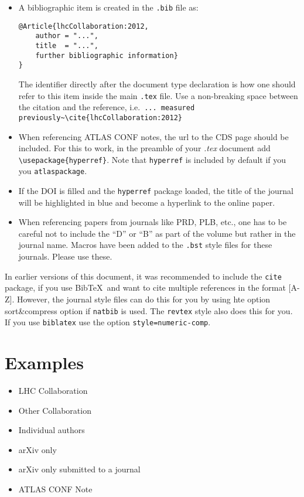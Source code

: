\documentclass[UKenglish]{latex/atlasdoc}
\newcommand*{\BibTeX}{Bib\TeX}
\newcommand{\File}[1]{\texttt{#1}\xspace}
\newcommand{\Option}[1]{\textsf{#1}\xspace}
\newcommand{\Package}[1]{\texttt{#1}\xspace}
\begin{document}
\begin{itemize}
\item A bibliographic item is created in the \File{.bib} file as:
\begin{verbatim}
@Article{lhcCollaboration:2012,
	author = "...",
	title  = "...",
	further bibliographic information}
}
\end{verbatim}
	The identifier directly after the document type declaration is how one should refer to this item inside the main \File{.tex} file.
	Use a non-breaking space between the citation and the reference, i.e.\
	\verb|... measured previously~\cite{lhcCollaboration:2012}|
\item When referencing ATLAS CONF notes, the url to the CDS page should be included.
	For this to work, in the preamble of your \emph{.tex} document add
	\texttt{\textbackslash usepackage\{hyperref\}}.
	Note that \Package{hyperref} is included by default	if you you \Package{atlaspackage}.
\item If the DOI is filled and the \texttt{hyperref} package loaded, 
	the title of the journal will be highlighted in blue and become a hyperlink to the online paper.
\item When referencing papers from journals like PRD, PLB, etc.,
	one has to be careful not to include the ``D'' or ``B'' as part of the volume but rather in the journal name. 
	Macros have been added to the \File{.bst} style files for these journals. Please use these.
\end{itemize}

In earlier versions of this document, it was recommended to include the \Package{cite} package, 
if you use \BibTeX\ and want to cite multiple references in the format [A-Z].
However, the journal style files can do this for you by using hte option \Option{sort\&compress} option if \Package{natbib} is used.
The \texttt{revtex} style also does this for you.
If you use \texttt{biblatex} use the option \texttt{style=numeric-comp}.

\section{Examples}

\begin{itemize}
	\item LHC Collaboration~\cite{lhcCollaboration:2012}
	\item Other Collaboration~\cite{otherCollaboration:2007}
	\item Individual authors~\cite{authors:2008}
	\item arXiv only~\cite{arxivOnly:2009}
	\item arXiv only submitted to a journal~\cite{arxivSub:2011}
	\item ATLAS CONF Note~\cite{atlasConf:2012} 
\end{itemize}
\end{document}
